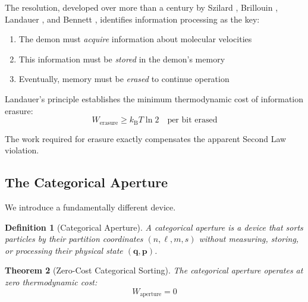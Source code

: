 \documentclass[twocolumn,10pt,twoside]{article}
\newtheorem{theorem}{Theorem}[section]
\newtheorem{definition}[theorem]{Definition}
\newcommand{\kb}{k_{\mathrm{B}}}
\newcommand{\partcoord}{(n,\ell,m,s)}
\begin{document}
The resolution, developed over more than a century by Szilard \cite{szilard1929}, Brillouin \cite{brillouin1951}, Landauer \cite{landauer1961}, and Bennett \cite{bennett1982,bennett2003}, identifies information processing as the key:
\begin{enumerate}
    \item The demon must \textit{acquire} information about molecular velocities
    \item This information must be \textit{stored} in the demon's memory
    \item Eventually, memory must be \textit{erased} to continue operation
\end{enumerate}

Landauer's principle establishes the minimum thermodynamic cost of information erasure:
\begin{equation}
W_{\text{erasure}} \geq \kb T \ln 2 \quad \text{per bit erased}
\label{eq:landauer_principle}
\end{equation}

The work required for erasure exactly compensates the apparent Second Law violation.

\subsection{The Categorical Aperture}

We introduce a fundamentally different device.

\begin{definition}[Categorical Aperture]
A categorical aperture is a device that sorts particles by their partition coordinates $\partcoord$ without measuring, storing, or processing their physical state $(\mathbf{q}, \mathbf{p})$.
\end{definition}

\begin{theorem}[Zero-Cost Categorical Sorting]
\label{thm:aperture}
The categorical aperture operates at zero thermodynamic cost:
\begin{equation}
W_{\text{aperture}} = 0
\end{equation}
\end{theorem}
\end{document}
